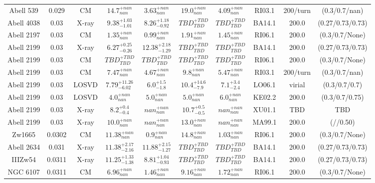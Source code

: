 \begin{table}
\begin{tabular}{cccccccccc}
Abell 539 & 0.029 & CM & ${14.7}^{+nan}_{nan}$ & ${3.63}^{+nan}_{nan}$ & ${19.0}^{+nan}_{nan}$ & ${4.09}^{+nan}_{nan}$ & RI03.1 & 200/turn & (0.3/0.7/nan) \\
Abell 4038 & 0.03 & X-ray & ${9.38}^{+1.03}_{-1.01}$ & ${8.26}^{+1.18}_{-0.92}$ & ${TBD}^{+TBD}_{TBD}$ & ${TBD}^{+TBD}_{TBD}$ & BA14.1 & 200.0 & (0.27/0.73/0.73) \\
Abell 2197 & 0.03 & CM & ${1.35}^{+nan}_{nan}$ & ${0.99}^{+nan}_{nan}$ & ${1.91}^{+nan}_{nan}$ & ${1.45}^{+nan}_{nan}$ & RI06.1 & 200.0 & (0.3/0.7/None) \\
Abell 2199 & 0.03 & X-ray & ${6.27}^{+0.25}_{-0.26}$ & ${12.38}^{+2.18}_{-1.29}$ & ${TBD}^{+TBD}_{TBD}$ & ${TBD}^{+TBD}_{TBD}$ & BA14.1 & 200.0 & (0.27/0.73/0.73) \\
Abell 2199 & 0.03 & CM & ${TBD}^{+TBD}_{TBD}$ & ${TBD}^{+TBD}_{TBD}$ & ${TBD}^{+TBD}_{TBD}$ & ${TBD}^{+TBD}_{TBD}$ & RI06.1 & 200.0 & (0.3/0.7/None) \\
Abell 2199 & 0.03 & CM & ${7.47}^{+nan}_{nan}$ & ${4.67}^{+nan}_{nan}$ & ${9.8}^{+nan}_{nan}$ & ${5.47}^{+nan}_{nan}$ & RI03.1 & 200/turn & (0.3/0.7/nan) \\
Abell 2199 & 0.03 & LOSVD & ${7.79}^{+11.26}_{-6.02}$ & ${6.0}^{+1.5}_{-1.8}$ & ${10.4}^{+14.6}_{-7.9}$ & ${7.1}^{+3.4}_{-2.4}$ & LO06.1 & virial & (0.3/0.7/0.7) \\
Abell 2199 & 0.03 & LOSVD & ${4.0}^{+nan}_{nan}$ & ${5.0}^{+nan}_{nan}$ & ${5.0}^{+nan}_{nan}$ & ${6.0}^{+nan}_{nan}$ & KE02.2 & 200.0 & (0.3/0.7/0.75) \\
Abell 2199 & 0.03 & X-ray & ${8.2}^{+0.4}_{-0.4}$ & ${nan}^{+nan}_{nan}$ & ${10.7}^{+0.5}_{-0.5}$ & ${nan}^{+nan}_{nan}$ & XU01.1 & TBD & TBD \\
Abell 2199 & 0.03 & X-ray & ${10.0}^{+nan}_{nan}$ & ${nan}^{+nan}_{nan}$ & ${13.0}^{+nan}_{nan}$ & ${nan}^{+nan}_{nan}$ & MA99.1 & 200.0 & (//0.50) \\
Zw1665 & 0.0302 & CM & ${11.38}^{+nan}_{nan}$ & ${0.9}^{+nan}_{nan}$ & ${14.8}^{+nan}_{nan}$ & ${1.03}^{+nan}_{nan}$ & RI06.1 & 200.0 & (0.3/0.7/None) \\
Abell 2634 & 0.031 & X-ray & ${11.38}^{+2.17}_{-2.16}$ & ${11.88}^{+2.15}_{-1.27}$ & ${TBD}^{+TBD}_{TBD}$ & ${TBD}^{+TBD}_{TBD}$ & BA14.1 & 200.0 & (0.27/0.73/0.73) \\
IIIZw54 & 0.0311 & X-ray & ${11.25}^{+1.33}_{-1.38}$ & ${8.81}^{+1.04}_{-0.93}$ & ${TBD}^{+TBD}_{TBD}$ & ${TBD}^{+TBD}_{TBD}$ & BA14.1 & 200.0 & (0.27/0.73/0.73) \\
NGC 6107 & 0.0311 & CM & ${6.96}^{+nan}_{nan}$ & ${1.46}^{+nan}_{nan}$ & ${9.16}^{+nan}_{nan}$ & ${1.72}^{+nan}_{nan}$ & RI06.1 & 200.0 & (0.3/0.7/None) \\

\end{tabular}
\end{table}
